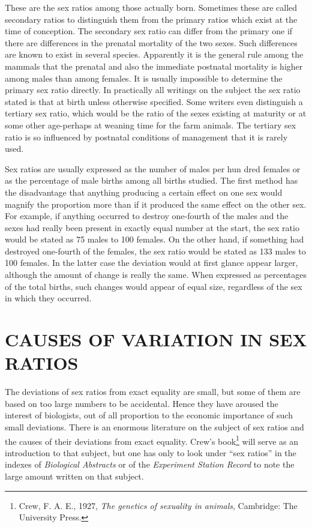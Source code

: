 These are the sex ratios among those actually born. Sometimes these
are called secondary ratios to distinguish them from the primary ratios
which exist at the time of conception. The secondary sex ratio can differ
from the primary one if there are differences in the prenatal mortality
of the two sexes. Such differences are known to exist in several species.
Apparently it is the general rule among the mammals that the prenatal
and also the immediate postnatal mortality is higher among males than
among females. It is usually impossible to determine the primary sex
ratio directly. In practically all writings on the subject the sex ratio
stated is that at birth unless otherwise specified. Some writers even distinguish
a tertiary sex ratio, which would be the ratio of the sexes existing
at maturity or at some other age-perhaps at weaning time for the
farm animals. The tertiary sex ratio is so influenced by postnatal conditions
of management that it is rarely used.

Sex ratios are usually expressed as the number of males per hun dred
females or as the percentage of male births among all births
studied. The first method has the disadvantage that anything producing
a certain effect on one sex would magnify the proportion more
than if it produced the same effect on the other sex. For example, if anything
occurred to destroy one-fourth of the males and the sexes had
really been present in exactly equal number at the start, the sex ratio
would be stated as 75 males to 100 females. On the other hand, if something
had destroyed one-fourth of the females, the sex ratio would be
stated as 133 males to 100 females. In the latter case the deviation would
at first glance appear larger, although the amount of change is really
the same. When expressed as percentages of the total births, such
changes would appear of equal size, regardless of the sex in which they
occurred.
\noclub

\section*{CAUSES OF VARIATION IN SEX RATIOS}

The deviations of sex ratios from exact equality are small, but some
of them are based on too large numbers to be accidental. Hence they
have aroused the interest of biologists, out of all proportion to the
economic importance of such small deviations. There is an enormous
literature on the subject of sex ratios and the causes of their deviations
from exact equality. Crew's book\footnote{Crew, F. A. E., 1927,
\textit{The genetics of sexuality in animals}, Cambridge: The University
Press.} will serve as an introduction to that subject, but one has only
to look under ``sex ratios'' in the indexes of \textit{Biological
Abstracts} or of the \textit{Experiment Station Record} to note the large
amount written on that subject.

